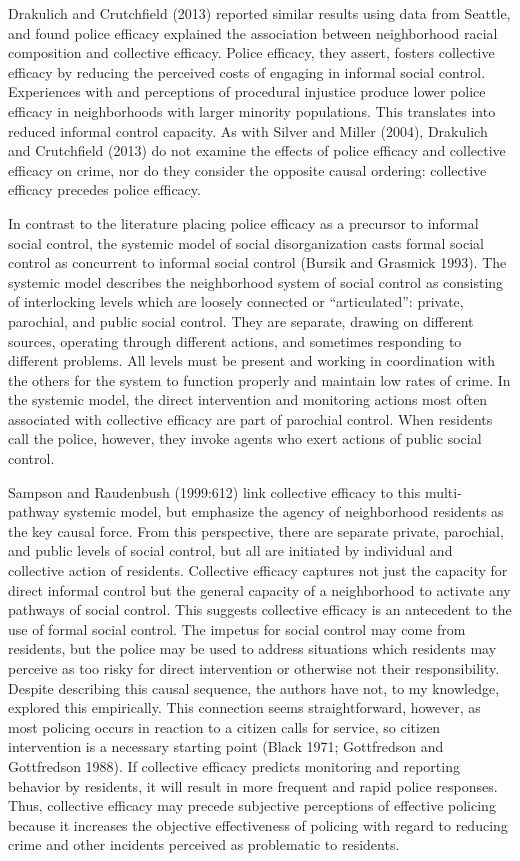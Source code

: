 \documentclass [11pt, proquest] {uwthesis}[2015/03/03]
\begin{document}
Drakulich and Crutchfield (2013) reported similar results using data from Seattle, and found police efficacy explained the association between neighborhood racial composition and collective efficacy. Police efficacy, they assert, fosters collective efficacy by reducing the perceived costs of engaging in informal social control. Experiences with and perceptions of procedural injustice produce lower police efficacy in neighborhoods with larger minority populations. This translates into reduced informal control capacity. As with Silver and Miller (2004), Drakulich and Crutchfield (2013) do not examine the effects of police efficacy and collective efficacy on crime, nor do they consider the opposite causal ordering: collective efficacy precedes police efficacy.

In contrast to the literature placing police efficacy as a precursor to informal social control, the systemic model of social disorganization casts formal social control as concurrent to informal social control (Bursik and Grasmick 1993). The systemic model describes the neighborhood system of social control as consisting of interlocking levels which are loosely connected or ``articulated'': private, parochial, and public social control. They are separate, drawing on different sources, operating through different actions, and sometimes responding to different problems. All levels must be present and working in coordination with the others for the system to function properly and maintain low rates of crime. In the systemic model, the direct intervention and monitoring actions most often associated with collective efficacy are part of parochial control. When residents call the police, however, they invoke agents who exert actions of public social control.

Sampson and Raudenbush (1999:612) link collective efficacy to this multi-pathway systemic model, but emphasize the agency of neighborhood residents as the key causal force. From this perspective, there are separate private, parochial, and public levels of social control, but all are initiated by individual and collective action of residents. Collective efficacy captures not just the capacity for direct informal control but the general capacity of a neighborhood to activate any pathways of social control. This suggests collective efficacy is an antecedent to the use of formal social control. The impetus for social control may come from residents, but the police may be used to address situations which residents may perceive as too risky for direct intervention or otherwise not their responsibility. Despite describing this causal sequence, the authors have not, to my knowledge, explored this empirically. This connection seems straightforward, however, as most policing occurs in reaction to a citizen calls for service, so citizen intervention is a necessary starting point (Black 1971; Gottfredson and Gottfredson 1988). If collective efficacy predicts monitoring and reporting behavior by residents, it will result in more frequent and rapid police responses. Thus, collective efficacy may precede subjective perceptions of effective policing because it increases the objective effectiveness of policing with regard to reducing crime and other incidents perceived as problematic to residents.
\end{document}
